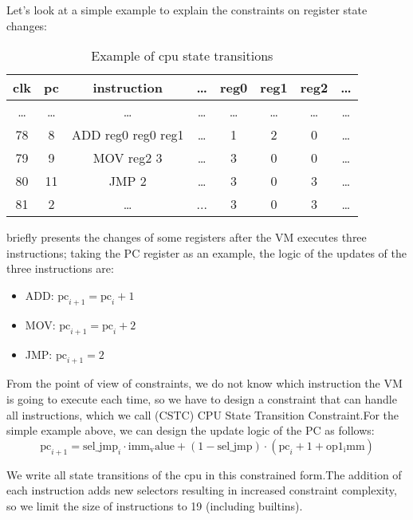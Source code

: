 Let's look at a simple example to explain the constraints on register state changes:
\begin{table}[!ht]
    \centering
    \begin{tabular}{|c|c|c|c|c|c|c|c|}
        \hline
        \rowcolor{gray} clk & pc    & instruction        & \dots & reg0  & reg1  & reg2  & \dots \\
        \hline
        \dots               & \dots & \dots              & \dots & \dots & \dots & \dots & \dots \\
        \hline
        78                  & 8     & ADD reg0 reg0 reg1 & \dots & 1     & 2     & 0     & \dots \\
        \hline
        79                  & 9     & MOV reg2 3         & \dots & 3     & 0     & 0     & \dots \\
        \hline
        80                  & 11    & JMP 2              & \dots & 3     & 0     & 3     & \dots \\
        \hline
        81                  & 2     & \dots              & ...   & 3     & 0     & 3     & \dots \\
        \hline
    \end{tabular}
    \caption{Example of cpu state transitions}
    \label{table:example-cpu-state-transitions}
\end{table}

 briefly presents the changes of some registers after the VM executes three
instructions; taking the PC register as an example, the logic of the updates of the three instructions are:
\begin{itemize}
    \item ADD: $\mathrm{pc}_{i+1} = \mathrm{pc}_i + 1$
    \item MOV: $\mathrm{pc}_{i+1} = \mathrm{pc}_i + 2$
    \item JMP: $\mathrm{pc}_{i+1} = 2$
\end{itemize}

From the point of view of constraints, we do not know which instruction the VM is going to execute each time, so we have to
design a constraint that can handle all instructions, which we call (CSTC) CPU State Transition Constraint.For the simple
example above, we can design the update logic of the PC as follows:
\[ \mathrm{pc}_{i+1} = \mathrm{sel\_jmp}_i \cdot \mathrm{imm_value} + (1 - \mathrm{sel\_jmp}) \cdot (\mathrm{pc}_i + 1 + \mathrm{op1_imm}) \]

We write all state transitions of the cpu in this constrained form.The addition of each instruction adds new selectors resulting
in increased constraint complexity, so we limit the size of instructions to 19 (including builtins).

